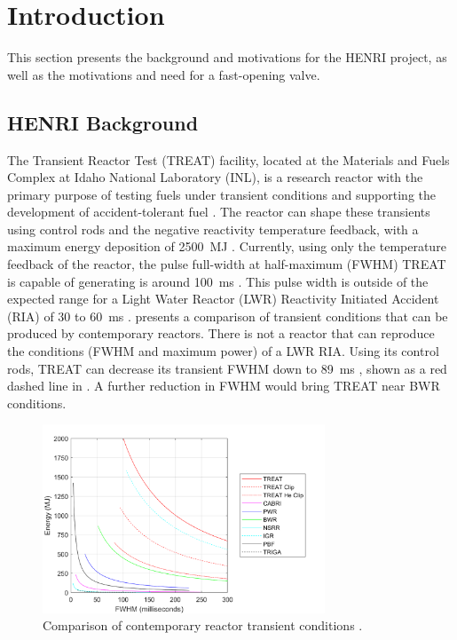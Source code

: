 \section{Introduction} \label{s:intro}
This section presents the background and motivations for the HENRI project, as well as the motivations and need for a fast-opening valve.

\subsection{HENRI Background} \label{ss:henri background}
The Transient Reactor Test (TREAT) facility, located at the Materials and Fuels Complex at Idaho National Laboratory (INL), is a research reactor with the primary purpose of testing fuels under transient conditions and supporting the development of accident-tolerant fuel \cite{CINBIZ2017}. The reactor can shape these transients using control rods and the negative reactivity temperature feedback, with a maximum energy deposition of \SI{2500}{\mega\joule} \cite{Holschuh2019}. Currently, using only the temperature feedback of the reactor, the pulse full-width at half-maximum (FWHM) TREAT is capable of generating is around \SI{100}{\milli\second} \cite{Holschuh2019}. This pulse width is outside of the expected range for a Light Water Reactor (LWR) Reactivity Initiated Accident (RIA) of 30 to \SI{60}{\milli\second} \cite{NEA2010}.  presents a comparison of transient conditions that can be produced by contemporary reactors. There is not a reactor that can reproduce the conditions (FWHM and maximum power) of a LWR RIA. Using its control rods, TREAT can decrease its transient FWHM down to \SI{89}{\milli\second} \cite{NEA2010}, shown as a red dashed line in . A further reduction in FWHM would bring TREAT near BWR conditions.



\begin{figure}[htbp]
    \vspace{16pt}
    \centering
    \includegraphics[width=0.75\textwidth]{intro/plots/ReactorTransientComp_Kevin.png}
    \caption{Comparison of contemporary reactor transient conditions \cite{BESS2019}.}
    \label{fig:trans comp}
    \vspace{16pt}
\end{figure}



